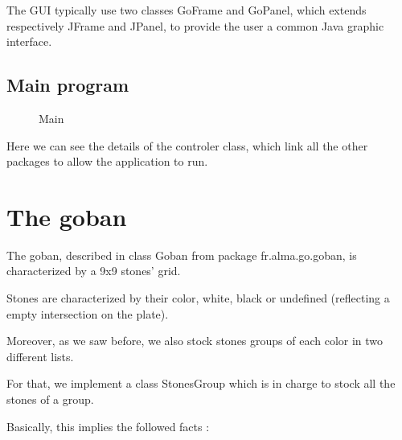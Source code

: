 \documentclass[12pt,a4paper,utf8x]{report}
\begin{document}
\begin{onehalfspace}
	The GUI typically use two classes GoFrame and GoPanel, which extends respectively JFrame and JPanel, to provide the user a common Java graphic interface.
	
	\clearpage
	
	\section{Main program}
	
	\begin{figure}[h!]
		\centering
		\caption{Main}
		\label{main} 
	\end{figure}
	
	Here we can see the details of the controler class, which link all the other packages to allow the application to run.
	
	\clearpage
	
	\chapter{The goban}
	
	The goban, described in class Goban from package fr.alma.go.goban, is characterized by a  9x9 stones' grid.

	Stones are characterized by their color, white, black or undefined (reflecting a empty intersection on the plate).
	
	Moreover, as we saw before, we also stock stones groups of each color in two different lists.

	For that, we implement a class StonesGroup which is in charge to stock all the stones of a group.

	Basically, this implies the followed facts :


\end{onehalfspace}
\end{document}
